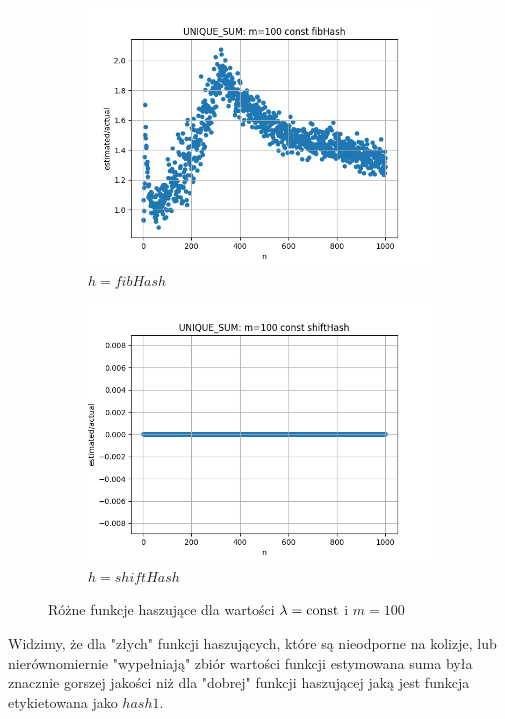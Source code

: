 \documentclass{article}
\begin{document}
\begin{figure}[H]
\begin{subfigure}{0.6\textwidth}
            \includegraphics[width=\linewidth]{sum/zad1_fibhash_const.png}
            \caption{$h = fibHash$}
        \end{subfigure}
        \begin{subfigure}{0.6\textwidth}
            \centering
            \includegraphics[width=\linewidth]{sum/zad1_shifthash_const.png}
            \caption{$h = shiftHash$}
        \end{subfigure}
        \caption{Różne funkcje haszujące dla wartości $\lambda = \textnormal{const}$ i $m = 100$}
    \end{figure}

    Widzimy, że dla "złych" funkcji haszujących, które są nieodporne na kolizje, lub 
    nierównomiernie "wypełniają" zbiór wartości funkcji estymowana suma była znacznie 
    gorszej jakości niż dla "dobrej" funkcji haszującej jaką jest funkcja etykietowana 
    jako $hash1$.
\end{document}
